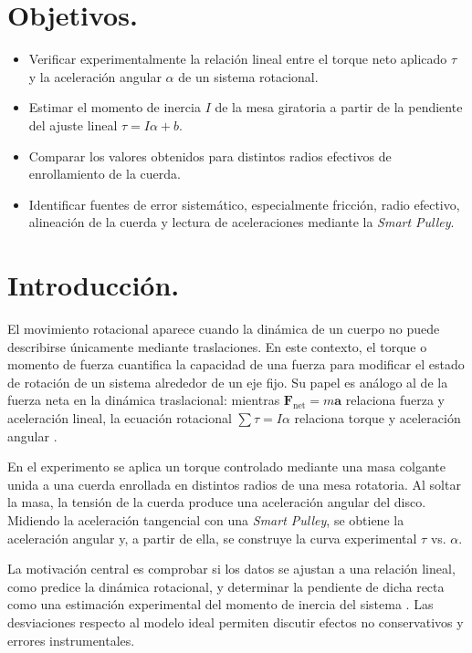 \documentclass[11pt,twocolumn]{article}
\makeatletter
\let\orig@parencite\parencite
\renewcommand{\parencite}[1]{\textcolor{Blue}{\orig@parencite{#1}}}
\renewcommand{\cite}[1]{\parencite{#1}}
\newcommand{\vect}[1]{\boldsymbol{#1}}
\makeatother
\begin{document}
\section{Objetivos.}
\begin{itemize}
    \item Verificar experimentalmente la relación lineal entre el torque neto aplicado $\tau$ y la aceleración angular $\alpha$ de un sistema rotacional.
    \item Estimar el momento de inercia $I$ de la mesa giratoria a partir de la pendiente del ajuste lineal $\tau=I\alpha+b$.
    \item Comparar los valores obtenidos para distintos radios efectivos de enrollamiento de la cuerda.
    \item Identificar fuentes de error sistemático, especialmente fricción, radio efectivo, alineación de la cuerda y lectura de aceleraciones mediante la \textit{Smart Pulley}.
\end{itemize}

\section{Introducción.}

El movimiento rotacional aparece cuando la dinámica de un cuerpo no puede describirse únicamente mediante traslaciones. En este contexto, el torque o momento de fuerza cuantifica la capacidad de una fuerza para modificar el estado de rotación de un sistema alrededor de un eje fijo. Su papel es análogo al de la fuerza neta en la dinámica traslacional: mientras $\vect{F}_{\mathrm{net}}=m\vect{a}$ relaciona fuerza y aceleración lineal, la ecuación rotacional $\sum\tau=I\alpha$ relaciona torque y aceleración angular \cite{halliday2014,serway2013}.

En el experimento se aplica un torque controlado mediante una masa colgante unida a una cuerda enrollada en distintos radios de una mesa rotatoria. Al soltar la masa, la tensión de la cuerda produce una aceleración angular del disco. Midiendo la aceleración tangencial con una \textit{Smart Pulley}, se obtiene la aceleración angular y, a partir de ella, se construye la curva experimental $\tau$ vs. $\alpha$.

La motivación central es comprobar si los datos se ajustan a una relación lineal, como predice la dinámica rotacional, y determinar la pendiente de dicha recta como una estimación experimental del momento de inercia del sistema \cite{feynman2010}. Las desviaciones respecto al modelo ideal permiten discutir efectos no conservativos y errores instrumentales.
\end{document}
